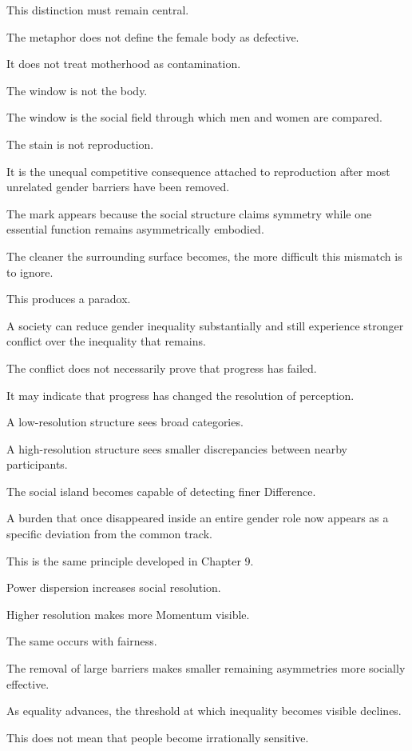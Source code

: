 This distinction must remain central.

The metaphor does not define the female body as defective.

It does not treat motherhood as contamination.

The window is not the body.

The window is the social field through which men and women are compared.

The stain is not reproduction.

It is the unequal competitive consequence attached to reproduction after most unrelated gender barriers have been removed.

The mark appears because the social structure claims symmetry while one essential function remains asymmetrically embodied.

The cleaner the surrounding surface becomes, the more difficult this mismatch is to ignore.

This produces a paradox.

A society can reduce gender inequality substantially and still experience stronger conflict over the inequality that remains.

The conflict does not necessarily prove that progress has failed.

It may indicate that progress has changed the resolution of perception.

A low-resolution structure sees broad categories.

A high-resolution structure sees smaller discrepancies between nearby participants.

The social island becomes capable of detecting finer Difference.

A burden that once disappeared inside an entire gender role now appears as a specific deviation from the common track.

This is the same principle developed in Chapter 9.

Power dispersion increases social resolution.

Higher resolution makes more Momentum visible.

The same occurs with fairness.

The removal of large barriers makes smaller remaining asymmetries more socially effective.

As equality advances, the threshold at which inequality becomes visible declines.

This does not mean that people become irrationally sensitive.

